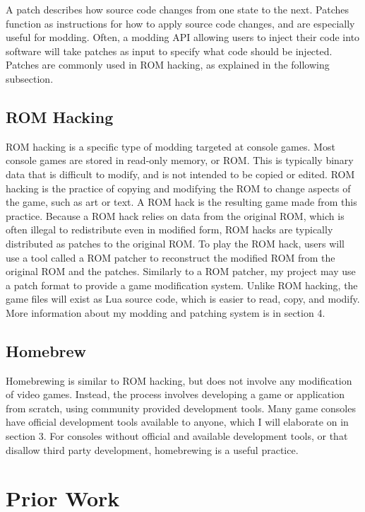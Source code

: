 \documentclass[10pt,twocolumn]{article}
\begin{document}
A patch describes how source code changes from one state to the next. Patches
function as instructions for how to apply source code changes, and are
especially useful for modding. Often, a modding API allowing users to inject
their code into software will take patches as input to specify what code should
be injected. Patches are commonly used in ROM hacking, as explained in the
following subsection.

\subsection{ROM Hacking}

ROM hacking is a specific type of modding targeted at console games.
Most console games are stored in read-only memory, or ROM.
This is typically binary data that is difficult to modify,
and is not intended to be copied or edited.
ROM hacking is the practice of copying and modifying the ROM to
change aspects of the game, such as art or text.
A ROM hack is the resulting game made from this practice.
Because a ROM hack relies on data from the original ROM,
which is often illegal to redistribute even in modified form,
ROM hacks are typically distributed as patches to the original ROM.
To play the ROM hack, users will use a tool called a ROM patcher to reconstruct
the modified ROM from the original ROM and the patches.
Similarly to a ROM patcher, my project may use a patch format to provide a
game modification system. Unlike ROM hacking, the game files will exist
as Lua source code, which is easier to read, copy, and modify.
More information about my modding and patching system is in section 4.

\subsection{Homebrew}

Homebrewing is similar to ROM hacking, but does not involve any modification
of video games. Instead, the process involves developing a game or application
from scratch, using community provided development tools. Many game consoles
have official development tools available to anyone, which I will elaborate on
in section 3. For consoles without official and available development tools, or
that disallow third party development, homebrewing is a useful practice.

\section{Prior Work}
\end{document}
